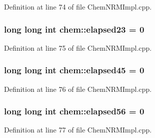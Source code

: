 Definition at line 74 of file Chem\-N\-R\-M\-Impl.\-cpp.

\hypertarget{namespacechem_a0197cd49bd8ebf45cab3710c9022c08d}{
\subsubsection[{elapsed23}]{\setlength{\rightskip}{0pt plus 5cm}long long int {\bf chem\-::elapsed23} = 0}}\label{namespacechem_a0197cd49bd8ebf45cab3710c9022c08d}


Definition at line 75 of file Chem\-N\-R\-M\-Impl.\-cpp.

\hypertarget{namespacechem_ac3fe333a7580df824dc4f7e827a05528}{
\subsubsection[{elapsed45}]{\setlength{\rightskip}{0pt plus 5cm}long long int {\bf chem\-::elapsed45} = 0}}\label{namespacechem_ac3fe333a7580df824dc4f7e827a05528}


Definition at line 76 of file Chem\-N\-R\-M\-Impl.\-cpp.

\hypertarget{namespacechem_a06af82e2b66ef7327fc568000f4a7279}{
\subsubsection[{elapsed56}]{\setlength{\rightskip}{0pt plus 5cm}long long int {\bf chem\-::elapsed56} = 0}}\label{namespacechem_a06af82e2b66ef7327fc568000f4a7279}


Definition at line 77 of file Chem\-N\-R\-M\-Impl.\-cpp.

